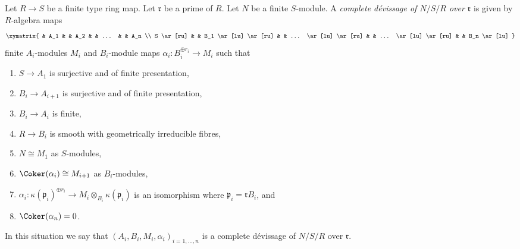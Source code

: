 \begin{definition}
\label{definition-complete-devissage-algebra}
Let $R \to S$ be a finite type ring map.
Let $\mathfrak r$ be a prime of $R$.
Let $N$ be a finite $S$-module.
A {\it complete d\'evissage of $N/S/R$ over $\mathfrak r$}
is given by $R$-algebra maps
$$
\xymatrix{
& A_1 & & A_2 & & ... & & A_n \\
S \ar[ru] & & B_1 \ar[lu] \ar[ru] & & ... \ar[lu] \ar[ru] & &
... \ar[lu] \ar[ru] & & B_n \ar[lu]
}
$$
finite $A_i$-modules $M_i$ and $B_i$-module maps
$\alpha_i : B_i^{\oplus r_i} \to M_i$ such that
\begin{enumerate}
\item $S \to A_1$ is surjective and of finite presentation,
\item $B_i \to A_{i + 1}$ is surjective and of finite presentation,
\item $B_i \to A_i$ is finite,
\item $R \to B_i$ is smooth with geometrically irreducible fibres,
\item $N \cong M_1$ as $S$-modules,
\item $\Coker(\alpha_i) \cong M_{i + 1}$ as $B_i$-modules,
\item $\alpha_i : \kappa(\mathfrak p_i)^{\oplus r_i}
\to M_i \otimes_{B_i} \kappa(\mathfrak p_i)$ is an isomorphism
where $\mathfrak p_i = \mathfrak rB_i$, and
\item $\Coker(\alpha_n) = 0$.
\end{enumerate}
In this situation we say that
$(A_i, B_i, M_i, \alpha_i)_{i = 1, \ldots, n}$
is a complete d\'evissage of $N/S/R$ over $\mathfrak r$.
\end{definition}